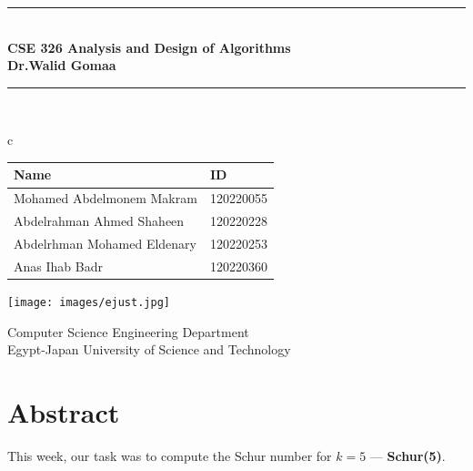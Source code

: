 \documentclass[12pt]{article}
\begin{document}
 

\begin{titlepage}
    \begin{center}
        \vspace*{1cm}

        \rule{\linewidth}{0.2mm} \\[0.4cm]
        {\Large \textbf{CSE 326 Analysis and Design of Algorithms }}\\[0.4cm]
        \textbf{Dr.Walid Gomaa}
 
        \rule{\linewidth}{0.2mm} \\[1.5cm]

        \begin{tabular}{c}
            \begin{tabular}{ll}
                \textbf{Name} & \textbf{ID} \\
                \hline
                Mohamed Abdelmonem Makram & 120220055 \\
                \hline
                Abdelrahman Ahmed Shaheen & 120220228 \\
                \hline
                Abdelrhman Mohamed Eldenary & 120220253 \\
                \hline
                Anas Ihab  Badr & 120220360 \\
                

            \end{tabular}
        \end{tabular}

        \vspace{1cm}

        

        \vspace{5cm}

        \texttt{[image: images/ejust.jpg]}


        Computer Science Engineering Department\\
        Egypt-Japan University of Science and Technology\\

    \end{center}
\end{titlepage}

\tableofcontents

\newpage

\section{Abstract}
This week, our task was to compute the Schur number for \( k = 5 \) — \textbf{Schur(5)}. 
\end{document}
